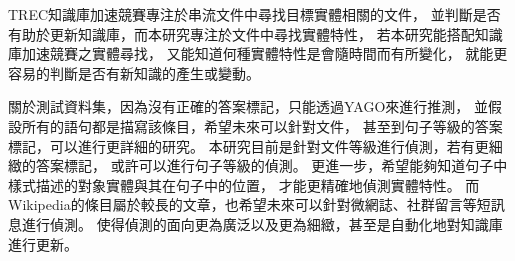 TREC知識庫加速競賽專注於串流文件中尋找目標實體相關的文件，
並判斷是否有助於更新知識庫，而本研究專注於文件中尋找實體特性，
若本研究能搭配知識庫加速競賽之實體尋找，
又能知道何種實體特性是會隨時間而有所變化，
就能更容易的判斷是否有新知識的產生或變動。

關於測試資料集，因為沒有正確的答案標記，只能透過YAGO來進行推測，
並假設所有的語句都是描寫該條目，希望未來可以針對文件，
甚至到句子等級的答案標記，可以進行更詳細的研究。
本研究目前是針對文件等級進行偵測，若有更細緻的答案標記，
或許可以進行句子等級的偵測。
更進一步，希望能夠知道句子中樣式描述的對象實體與其在句子中的位置，
才能更精確地偵測實體特性。
而Wikipedia的條目屬於較長的文章，也希望未來可以針對微網誌、社群留言等短訊息進行偵測。
使得偵測的面向更為廣泛以及更為細緻，甚至是自動化地對知識庫進行更新。


